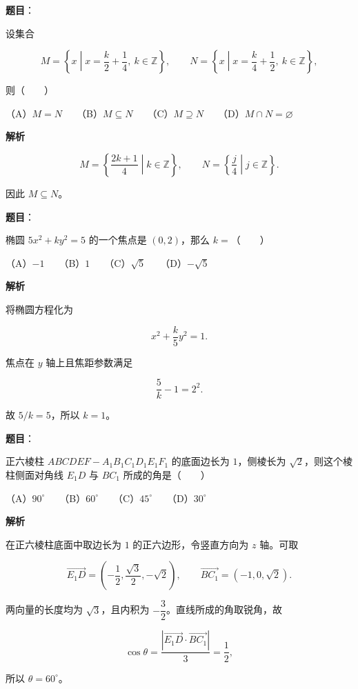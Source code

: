 \begin{answer}

\textbf{题目}：

设集合

\nopagebreak[4]
\[
M=\left\{x\middle|x=\frac{k}{2}+\frac14,\ k\in\mathbb Z\right\},\qquad
N=\left\{x\middle|x=\frac{k}{4}+\frac12,\ k\in\mathbb Z\right\},
\]

则\mbox{（　　）}

（A）$M=N$　　（B）$M\subseteq N$　　（C）$M\supseteq N$　　（D）$M\cap N=\varnothing$

\textbf{解析}

\nopagebreak[4]
\[
M=\left\{\frac{2k+1}{4}\middle|k\in\mathbb Z\right\},\qquad
N=\left\{\frac{j}{4}\middle|j\in\mathbb Z\right\}.
\]

因此 $M\subseteq N$。


\end{answer}
\begin{answer}

\textbf{题目}：

椭圆 $5x^2+ky^2=5$ 的一个焦点是 $(0,2)$，那么 $k=$\mbox{（　　）}

（A）$-1$　　（B）$1$　　（C）$\sqrt5$　　（D）$-\sqrt5$

\textbf{解析}

将椭圆方程化为

\nopagebreak[4]
\[
x^2+\frac{k}{5}y^2=1.
\]

焦点在 $y$ 轴上且焦距参数满足

\nopagebreak[4]
\[
\frac5k-1=2^2.
\]

故 $5/k=5$，所以 $k=1$。


\end{answer}
\begin{answer}

\textbf{题目}：

正六棱柱 $ABCDEF-A_1B_1C_1D_1E_1F_1$ 的底面边长为 $1$，侧棱长为 $\sqrt2$，则这个棱柱侧面对角线 $E_1D$ 与 $BC_1$ 所成的角是\mbox{（　　）}

（A）$90^\circ$　　（B）$60^\circ$　　（C）$45^\circ$　　（D）$30^\circ$

\textbf{解析}

在正六棱柱底面中取边长为 $1$ 的正六边形，令竖直方向为 $z$ 轴。可取

\nopagebreak[4]
\[
\overrightarrow{E_1D}=\left(-\frac12,\frac{\sqrt3}{2},-\sqrt2\right),\qquad
\overrightarrow{BC_1}=(-1,0,\sqrt2).
\]

两向量的长度均为 $\sqrt3$，且内积为 $-\dfrac32$。直线所成的角取锐角，故

\nopagebreak[4]
\[
\cos\theta=\frac{|\overrightarrow{E_1D}\cdot\overrightarrow{BC_1}|}{3}
=\frac12,
\]

所以 $\theta=60^\circ$。


\end{answer}

